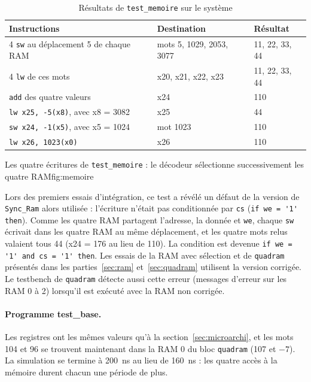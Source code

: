 \begin{table}[H]
\centering
\begin{tabular}{lll}
\toprule
Instructions & Destination & Résultat \\
\midrule
4 \texttt{sw} au déplacement 5 de chaque RAM & mots 5, 1029, 2053, 3077 & 11, 22, 33, 44 \\
4 \texttt{lw} de ces mots & x20, x21, x22, x23 & 11, 22, 33, 44 \\
\texttt{add} des quatre valeurs & x24 & 110 \\
\texttt{lw x25, -5(x8)}, avec x8 = 3082 & x25 & 44 \\
\texttt{sw x24, -1(x5)}, avec x5 = 1024 & mot 1023 & 110 \\
\texttt{lw x26, 1023(x0)} & x26 & 110 \\
\bottomrule
\end{tabular}
\caption{Résultats de \texttt{test\_memoire} sur le système}
\label{tab:memoire}
\end{table}

{Les quatre écritures de \texttt{test\_memoire} : le décodeur sélectionne successivement les
quatre RAM}{fig:memoire}

Lors des premiers essais d'intégration, ce test a révélé un défaut de la version de
\texttt{Sync\_Ram} alors utilisée : l'écriture n'était pas conditionnée par \texttt{cs}
(\lstinline[style=vlinline]|if we = '1' then|).
Comme les quatre RAM partagent l'adresse, la donnée et \texttt{we}, chaque \texttt{sw} écrivait
dans les quatre RAM au même déplacement, et les quatre mots relus valaient tous 44 (x24 = 176 au
lieu de 110). La condition est devenue \lstinline[style=vlinline]|if we = '1' and cs = '1' then|.
Les essais de la RAM avec sélection et de \texttt{quadram} présentés dans les
parties~\ref{sec:ram} et~\ref{sec:quadram} utilisent la version corrigée. Le testbench de \texttt{quadram} détecte aussi cette erreur
(messages d'erreur sur les RAM 0 à 2) lorsqu'il est exécuté avec la RAM non corrigée.

\paragraph{Programme test\_base.}
Les registres ont les mêmes valeurs qu'à la section~\ref{sec:microarchi}, et les mots 104 et 96
se trouvent maintenant dans la RAM 0 du bloc \texttt{quadram} (107 et $-7$). La simulation se
termine à 200~ns au lieu de 160~ns : les quatre accès à la mémoire durent chacun une période de
plus.

